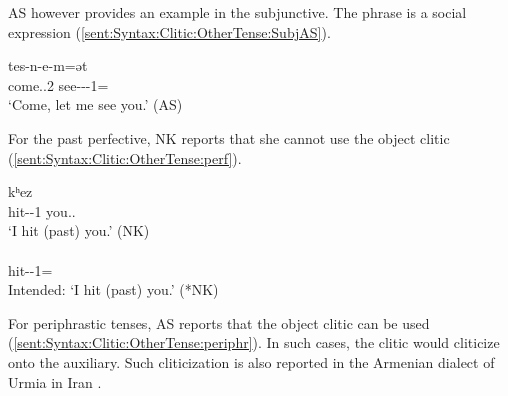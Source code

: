 AS however provides an example  in the subjunctive. The phrase is a   social expression    (\ref{sent:Syntax:Clitic:OtherTense:SubjAS}).

\begin{exe}
	
	\ex {}  {tes-n-e-m=ət}
	\\
	come.{\imp}.2{\sg} see-{\vx}-{\thgloss}-1{\sg}={\possSsg}
	\\
	\trans	`Come, let me see   you.’ \hfill    (AS)\label{sent:Syntax:Clitic:OtherTense:SubjAS}
	\\
\end{exe}

For the past perfective, NK reports that she cannot use the object clitic (\ref{sent:Syntax:Clitic:OtherTense:perf}). 

\begin{exe}
	\ex \label{sent:Syntax:Clitic:OtherTense:perf}
	\begin{xlist}
		
		\ex {}  {kʰez} 
		\\
		hit-{\pst}-1{\sg} you.{\sg}.{\dat}
		\\
		\trans	`I hit (past) you.' \hfill   (NK)
		\\
		\ex {} 
		\\
		hit-{\pst}-1{\sg}={\possSsg}
		\\
		\trans	Intended:  `I hit (past) you.’ \hfill  (*NK)
		
\end{xlist}\end{exe}


For periphrastic tenses, AS reports that the object clitic can be used (\ref{sent:Syntax:Clitic:OtherTense:periphr}). In such cases, the clitic would cliticize onto the auxiliary. Such cliticization is also reported in the Armenian dialect of Urmia in Iran \citep[282]{Gharibyan-1941-SummaryArmenianDialectology}. 

